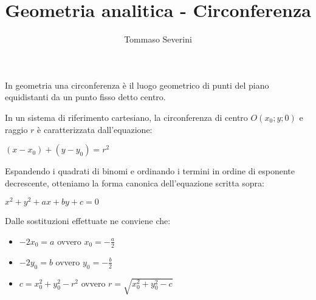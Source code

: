 \documentclass[10pt,a4paper]{article}
\author{Tommaso Severini}
\title{Geometria analitica - Circonferenza}
\begin{document}
	\maketitle
	
	
	In geometria una circonferenza è il luogo geometrico di punti del piano equidistanti da un punto fisso detto centro.
	
	\begin{center}

	\end{center}
	
	In un sistema di riferimento cartesiano, la circonferenza di centro $O(x_0;y;0)$ e raggio $r$ è caratterizzata dall'equazione:
	\begin{definition}
	\centering	$(x-x_0) + (y-y_0) = r^2 $
	\end{definition}
	
	Espandendo i quadrati di binomi e ordinando i termini in ordine di esponente decrescente, otteniamo la forma canonica dell'equazione scritta sopra:
	
	\begin{definition}
		\centering	$x^2 + y^2 + ax + by + c = 0$
		
		Dalle sostituzioni effettuate ne conviene che:
		\begin{itemize}
			\item $-2x_0 = a$ ovvero $ x_0 = -\frac{a}{2}$
			\item $-2y_0 = b$ ovvero $ y_0 = -\frac{b}{2}$
			\item $c = x_0^2 + y_0^2 -r^2$ ovvero $ r = \sqrt{x_0^2 + y_0^2 -c}$
		\end{itemize}
	\end{definition}
	
\end{document}
